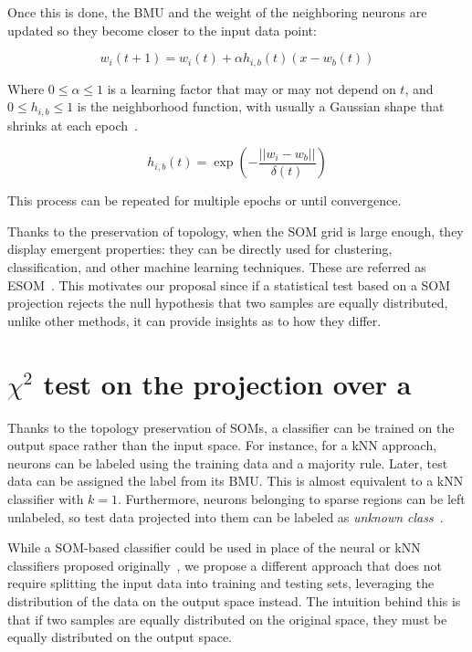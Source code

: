 Once this is done, the \gls{BMU} and the weight of the neighboring neurons are updated so they become
closer to the input data point:

\begin{equation}
    w_i(t + 1) = w_i(t) + \alpha h_{i,b}(t) (x - w_b(t))
\end{equation}

Where $0 \le \alpha \le 1$ is a learning factor that may or may not depend on $t$,
and $0 \le h_{i,b} \le 1$ is the neighborhood function, with usually a Gaussian shape
that shrinks at each epoch~\cite{Villmann1999,wittek2013somoclu}.

\begin{equation}
    h_{i,b}(t) = \exp(- \frac{||w_i - w_b||}{\delta(t)})
\end{equation}

This process can be repeated for multiple epochs or until convergence.

\medskip

Thanks to the preservation of topology, when the \gls{SOM}  grid is large enough,
they display emergent properties: they can be directly used for clustering,
classification, and other machine learning techniques. These are referred as
\gls{ESOM}~\cite{ultsch2005esom}.
This motivates our proposal since if a statistical test based on a \gls{SOM}
projection rejects the null hypothesis that two samples are equally distributed,
unlike other methods, it can provide insights as to how they differ.

\section{\texorpdfstring{$\chi^2$}{χ²} test on the projection over a }
\label{sec:som_chi2}

Thanks to the topology preservation of \glspl{SOM}, a classifier can be trained
on the output space rather than the input space. For instance, for a \gls{kNN}
approach, neurons can be labeled using the training data and a majority rule. Later, test data
can be assigned the label from its \gls{BMU}. This is almost equivalent to a \gls{kNN} classifier with $k=1$.
Furthermore, neurons belonging to sparse regions can be left unlabeled, so test data projected
into them can be labeled as \emph{unknown class}~\cite{ultsch2005esom,silva2011som}.

While a \gls{SOM}-based classifier could be used in place of the neural or \gls{kNN} classifiers proposed
originally~\cite{lopez2016revisiting}, we propose a different approach that does not require
splitting the input data into training and testing sets, leveraging the distribution of the
data on the output space instead. The intuition behind this is that if two samples are equally
distributed on the original space, they must be equally distributed on the output space.

